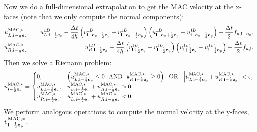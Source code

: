 Now we do a full-dimensional extrapolation to get the MAC velocity at
the x-faces (note that we only compute the normal components):
\begin{eqnarray}
u_{L,{\bf i}-\frac{1}{2}{\bf e}_x}^{\rm MAC,*} &=& u_{L,{\bf i}-\frac{1}{2}{\bf e}_x}^{1D} - \frac{\Delta t}{4h}\left(v_{{\bf i}-{\bf e}_x+\frac{1}{2}{\bf e}_y}^{1D}+v_{{\bf i}-{\bf e}_x-\frac{1}{2}{\bf e}_y}^{1D}\right)\left(u_{{\bf i}-{\bf e}_x+\frac{1}{2}{\bf e}_y}^{1D} - u_{{\bf i}-{\bf e}_x-\frac{1}{2}{\bf e}_y}^{1D}\right) + \frac{\Delta t}{2}f_{u,{\bf i}-{\bf e}_x}, \\
u_{R,{\bf i}-\frac{1}{2}{\bf e}_x}^{\rm MAC,*} &=& u_{R,{\bf i}-\frac{1}{2}{\bf e}_x}^{1D} - \frac{\Delta t}{4h}\left(v_{{\bf i}+\frac{1}{2}{\bf e}_y}^{1D}+v_{{\bf i}-\frac{1}{2}{\bf e}_y}^{1D}\right)\left(u_{{\bf i}+\frac{1}{2}{\bf e}_y}^{1D} - u_{{\bf i}-\frac{1}{2}{\bf e}_y}^{1D}\right) + \frac{\Delta t}{2}f_{u,{\bf i}}.
\end{eqnarray}
Then we solve a Riemann problem:
\begin{equation}
u_{{\bf i}-\frac{1}{2}{\bf e}_x}^{\rm MAC,*} =
\begin{cases}
0, & \left(u_{L,{\bf i}-\frac{1}{2}{\bf e}_x}^{\rm MAC,*} \le 0 ~~ {\rm AND} ~~ u_{R,{\bf i}-\frac{1}{2}{\bf e}_x}^{\rm MAC,*} \ge 0\right) ~~ {\rm OR} ~~ \left|u_{L,{\bf i}-\frac{1}{2}{\bf e}_x}^{\rm MAC,*} + u_{R,{\bf i}-\frac{1}{2}{\bf e}_x}^{\rm MAC,*}\right| < \epsilon, \\
u_{L,{\bf i}-\frac{1}{2}{\bf e}_x}^{\rm MAC,*}, & u_{L,{\bf i}-\frac{1}{2}{\bf e}_x}^{\rm MAC,*} + u_{R,{\bf i}-\frac{1}{2}{\bf e}_x}^{\rm MAC,*} > 0, \\
u_{R,{\bf i}-\frac{1}{2}{\bf e}_x}^{\rm MAC,*}, & u_{L,{\bf i}-\frac{1}{2}{\bf e}_x}^{\rm MAC,*} + u_{R,{\bf i}-\frac{1}{2}{\bf e}_x}^{\rm MAC,*} < 0.
\end{cases}\label{umac Riemann Problem}
\end{equation}
We perform analogous operations to compute the normal velocity at the
y-faces, $v^{\rm MAC,*}_{{\bf i}-\frac{1}{2}{\bf e}_y}$.

